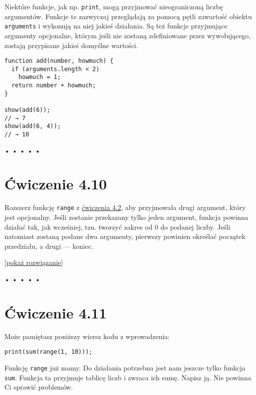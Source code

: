 Niektóre funkcje, jak np. \texttt{print}, mogą przyjmować nieograniczoną liczbę argumentów. Funkcje te zazwyczaj przeglądają za pomocą pętli zawartość obiektu \texttt{arguments} i wykonują na niej jakieś działania. Są też funkcje przyjmujące argumenty opcjonalne, którym jeśli nie zostaną zdefiniowane przez wywołującego, zostają przypisane jakieś domyślne wartości.

    
\begin{verbatim} 
function add(number, howmuch) {
  if (arguments.length < 2)
    howmuch = 1;
  return number + howmuch;
}

show(add(6));
// → 7
show(add(6, 4));
// → 10
\end{verbatim}
  
  
\begin{center}
• • • • •
\end{center}
  
    
\section*{Ćwiczenie 4.10}
\label{sec:4.10}
    
      
Rozszerz funkcję \texttt{range} z \hyperref[sec:4.2]{ćwiczenia 4.2}, aby przyjmowała drugi argument, który jest opcjonalny. Jeśli zostanie przekazany tylko jeden argument, funkcja powinna działać tak, jak wcześniej, tzn. tworzyć zakres od 0 do podanej liczby. Jeśli natomiast zostaną podane dwa argumenty, pierwszy powinien określać początek przedziału, a drugi — koniec.

    
[\hyperref[sol:4.10]{pokaż rozwiązanie}]
    
  
\begin{center}
• • • • •
\end{center}
  
    
\section*{Ćwiczenie 4.11}
\label{sec:4.11}
    
      
Może pamiętasz poniższy wiersz kodu z wprowadzenia:

      
\begin{verbatim} 
print(sum(range(1, 10)));
\end{verbatim}
      
Funkcję \texttt{range} już mamy. Do działania potrzebna jest nam jeszcze tylko funkcja \texttt{sum}. Funkcja ta przyjmuje tablicę liczb i zwraca ich sumę. Napisz ją. Nie powinna Ci sprawić problemów.

